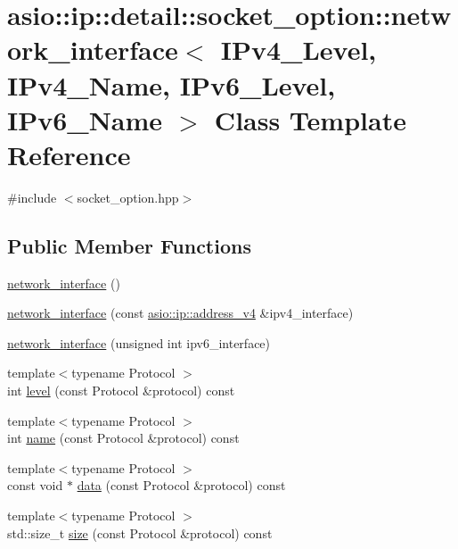 \hypertarget{classasio_1_1ip_1_1detail_1_1socket__option_1_1network__interface}{}\section{asio\+:\+:ip\+:\+:detail\+:\+:socket\+\_\+option\+:\+:network\+\_\+interface$<$ I\+Pv4\+\_\+\+Level, I\+Pv4\+\_\+\+Name, I\+Pv6\+\_\+\+Level, I\+Pv6\+\_\+\+Name $>$ Class Template Reference}
\label{classasio_1_1ip_1_1detail_1_1socket__option_1_1network__interface}


{\ttfamily \#include $<$socket\+\_\+option.\+hpp$>$}

\subsection*{Public Member Functions}
\begin{DoxyCompactItemize}
\item 
\hyperlink{classasio_1_1ip_1_1detail_1_1socket__option_1_1network__interface_aa38869b26720ed37ae356c98c19ab181}{network\+\_\+interface} ()
\item 
\hyperlink{classasio_1_1ip_1_1detail_1_1socket__option_1_1network__interface_a949aad0c3543c091c46925a1b0a193ae}{network\+\_\+interface} (const \hyperlink{classasio_1_1ip_1_1address__v4}{asio\+::ip\+::address\+\_\+v4} \&ipv4\+\_\+interface)
\item 
\hyperlink{classasio_1_1ip_1_1detail_1_1socket__option_1_1network__interface_addde23815ff7aaae4c6896eb719ff459}{network\+\_\+interface} (unsigned int ipv6\+\_\+interface)
\item 
{\footnotesize template$<$typename Protocol $>$ }\\int \hyperlink{classasio_1_1ip_1_1detail_1_1socket__option_1_1network__interface_a5ec8d42ea67bd17a202219c7ccf5b440}{level} (const Protocol \&protocol) const 
\item 
{\footnotesize template$<$typename Protocol $>$ }\\int \hyperlink{classasio_1_1ip_1_1detail_1_1socket__option_1_1network__interface_a0834a8dc3fb5bd3e51a81cff19cfa397}{name} (const Protocol \&protocol) const 
\item 
{\footnotesize template$<$typename Protocol $>$ }\\const void $\ast$ \hyperlink{classasio_1_1ip_1_1detail_1_1socket__option_1_1network__interface_a58ce502edfd83e9f6f4218d2f5600801}{data} (const Protocol \&protocol) const 
\item 
{\footnotesize template$<$typename Protocol $>$ }\\std\+::size\+\_\+t \hyperlink{classasio_1_1ip_1_1detail_1_1socket__option_1_1network__interface_aa6ec3b77c0273e9b17ca46344bbed5e7}{size} (const Protocol \&protocol) const 
\end{DoxyCompactItemize}


